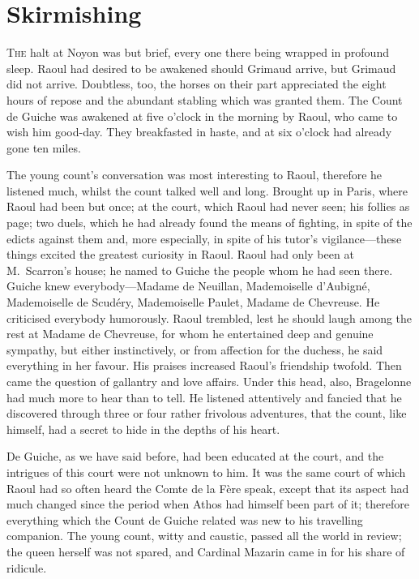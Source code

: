 \chapter{Skirmishing}

 \lettrine{T}{he} halt at Noyon was but brief, every one there being wrapped in profound sleep. Raoul had desired to be awakened should Grimaud arrive, but Grimaud did not arrive. Doubtless, too, the horses on their part appreciated the eight hours of repose and the abundant stabling which was granted them. The Count de Guiche was awakened at five o'clock in the morning by Raoul, who came to wish him good-day. They breakfasted in haste, and at six o'clock had already gone ten miles.

The young count's conversation was most interesting to Raoul, therefore he listened much, whilst the count talked well and long. Brought up in Paris, where Raoul had been but once; at the court, which Raoul had never seen; his follies as page; two duels, which he had already found the means of fighting, in spite of the edicts against them and, more especially, in spite of his tutor's vigilance—these things excited the greatest curiosity in Raoul. Raoul had only been at M.~Scarron's house; he named to Guiche the people whom he had seen there. Guiche knew everybody—Madame de Neuillan, Mademoiselle d'Aubigné, Mademoiselle de Scudéry, Mademoiselle Paulet, Madame de Chevreuse. He criticised everybody humorously. Raoul trembled, lest he should laugh among the rest at Madame de Chevreuse, for whom he entertained deep and genuine sympathy, but either instinctively, or from affection for the duchess, he said everything in her favour. His praises increased Raoul's friendship twofold. Then came the question of gallantry and love affairs. Under this head, also, Bragelonne had much more to hear than to tell. He listened attentively and fancied that he discovered through three or four rather frivolous adventures, that the count, like himself, had a secret to hide in the depths of his heart.

De Guiche, as we have said before, had been educated at the court, and the intrigues of this court were not unknown to him. It was the same court of which Raoul had so often heard the Comte de la Fère speak, except that its aspect had much changed since the period when Athos had himself been part of it; therefore everything which the Count de Guiche related was new to his travelling companion. The young count, witty and caustic, passed all the world in review; the queen herself was not spared, and Cardinal Mazarin came in for his share of ridicule.

